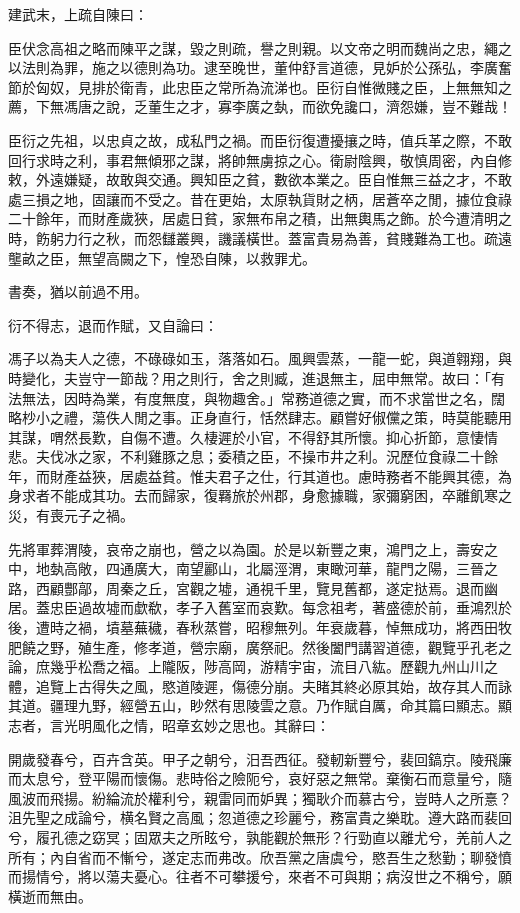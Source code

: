 
\begin{pinyinscope}
建武末，上疏自陳曰：

臣伏念高祖之略而陳平之謀，毀之則疏，譽之則親。以文帝之明而魏尚之忠，繩之以法則為罪，施之以德則為功。逮至晚世，董仲舒言道德，見妒於公孫弘，李廣奮節於匈奴，見排於衛青，此忠臣之常所為流涕也。臣衍自惟微賤之臣，上無無知之薦，下無馮唐之說，乏董生之才，寡李廣之埶，而欲免讒口，濟怨嫌，豈不難哉！

臣衍之先祖，以忠貞之故，成私門之禍。而臣衍復遭擾攘之時，值兵革之際，不敢回行求時之利，事君無傾邪之謀，將帥無虜掠之心。衛尉陰興，敬慎周密，內自修敕，外遠嫌疑，故敢與交通。興知臣之貧，數欲本業之。臣自惟無三益之才，不敢處三損之地，固讓而不受之。昔在更始，太原執貨財之柄，居蒼卒之閒，據位食祿二十餘年，而財產歲狹，居處日貧，家無布帛之積，出無輿馬之飾。於今遭清明之時，飭躬力行之秋，而怨讎叢興，譏議橫世。蓋富貴易為善，貧賤難為工也。疏遠壟畝之臣，無望高闕之下，惶恐自陳，以救罪尤。

書奏，猶以前過不用。

衍不得志，退而作賦，又自論曰：

馮子以為夫人之德，不碌碌如玉，落落如石。風興雲蒸，一龍一蛇，與道翱翔，與時變化，夫豈守一節哉？用之則行，舍之則臧，進退無主，屈申無常。故曰：「有法無法，因時為業，有度無度，與物趣舍。」常務道德之實，而不求當世之名，闊略杪小之禮，蕩佚人閒之事。正身直行，恬然肆志。顧嘗好俶儻之策，時莫能聽用其謀，喟然長歎，自傷不遭。久棲遲於小官，不得舒其所懷。抑心折節，意悽情悲。夫伐冰之家，不利雞豚之息；委積之臣，不操市井之利。況歷位食祿二十餘年，而財產益狹，居處益貧。惟夫君子之仕，行其道也。慮時務者不能興其德，為身求者不能成其功。去而歸家，復羇旅於州郡，身愈據職，家彌窮困，卒離飢寒之災，有喪元子之禍。

先將軍葬渭陵，哀帝之崩也，營之以為園。於是以新豐之東，鴻門之上，壽安之中，地埶高敞，四通廣大，南望酈山，北屬涇渭，東瞰河華，龍門之陽，三晉之路，西顧酆鄗，周秦之丘，宮觀之墟，通視千里，覽見舊都，遂定挞焉。退而幽居。蓋忠臣過故墟而歔欷，孝子入舊室而哀歎。每念祖考，著盛德於前，垂鴻烈於後，遭時之禍，墳墓蕪穢，春秋蒸嘗，昭穆無列。年衰歲暮，悼無成功，將西田牧肥饒之野，殖生產，修孝道，營宗廟，廣祭祀。然後闔門講習道德，觀覽乎孔老之論，庶幾乎松喬之福。上隴阪，陟高岡，游精宇宙，流目八紘。歷觀九州山川之體，追覽上古得失之風，愍道陵遲，傷德分崩。夫睹其終必原其始，故存其人而詠其道。疆理九野，經營五山，眇然有思陵雲之意。乃作賦自厲，命其篇曰顯志。顯志者，言光明風化之情，昭章玄妙之思也。其辭曰：

開歲發春兮，百卉含英。甲子之朝兮，汨吾西征。發軔新豐兮，裴回鎬京。陵飛廉而太息兮，登平陽而懷傷。悲時俗之險阨兮，哀好惡之無常。棄衡石而意量兮，隨風波而飛揚。紛綸流於權利兮，親雷同而妒異；獨耿介而慕古兮，豈時人之所憙？沮先聖之成論兮，横名賢之高風；忽道德之珍麗兮，務富貴之樂耽。遵大路而裴回兮，履孔德之窈冥；固眾夫之所眩兮，孰能觀於無形？行勁直以離尤兮，羌前人之所有；內自省而不慚兮，遂定志而弗改。欣吾黨之唐虞兮，愍吾生之愁勤；聊發憤而揚情兮，將以蕩夫憂心。往者不可攀援兮，來者不可與期；病沒世之不稱兮，願橫逝而無由。


\end{pinyinscope}
